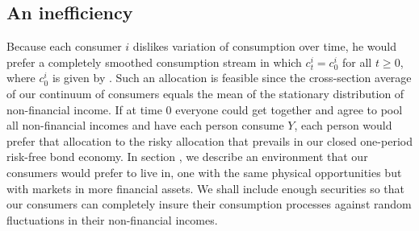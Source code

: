 


\subsection{An inefficiency}
Because each consumer $i$ dislikes variation of  consumption over time, he would prefer a completely smoothed   consumption stream  in which $c^i_t = c^i_0$ for all $t \geq 0$, where
$c^i_0$ is given by .
Such an allocation 
is  feasible since the cross-section average of our continuum of consumers  equals the mean of the
stationary distribution of non-financial income.
If at time $0$ everyone could get together and agree to
pool all   non-financial incomes  and  have each person consume $Y$, each 
person would prefer that allocation to the 
risky allocation that prevails  in our closed one-period risk-free bond economy.   In section , we describe an environment that our consumers would prefer to  live in, one  with the same physical opportunities but with markets in more financial assets.  We shall include  enough securities  so that our consumers can  completely insure their consumption processes   against random 
fluctuations in their non-financial incomes. 





%
%
